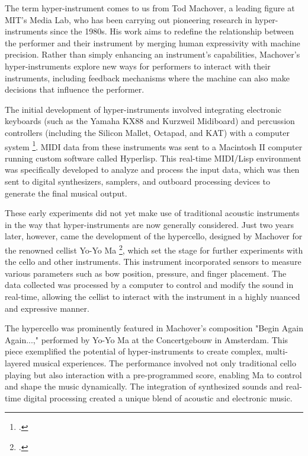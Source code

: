 \documentclass[12pt,twoside,maitrise]{dms_ks}
\theoremstyle{definition}
\begin{document}
{The term hyper-instrument comes to us from Tod Machover, a leading figure at MIT's Media Lab, who has been carrying out pioneering research in hyper-instruments since the 1980s. 
His work aims to redefine the relationship between the performer and their instrument by merging human expressivity with machine precision. 
Rather than simply enhancing an instrument's capabilities, Machover's hyper-instruments explore new ways for performers to interact with their instruments, including feedback mechanisms where the machine can also make decisions that influence the performer.

The initial development of hyper-instruments involved integrating electronic keyboards (such as the Yamaha KX88 and Kurzweil Midiboard) and percussion controllers (including the Silicon Mallet, Octapad, and KAT) with a computer system \footcite{machover_hyper-instruments_1989}. 
MIDI data from these instruments was sent to a Macintosh II computer running custom software called Hyperlisp. 
This real-time MIDI/Lisp environment was specifically developed to analyze and process the input data, which was then sent to digital synthesizers, samplers, and outboard processing devices to generate the final musical output.

These early experiments did not yet make use of traditional acoustic instruments in the way that hyper-instruments are now generally considered. Just two years later, however, came the development of the hypercello, designed by Machover for the renowned cellist Yo-Yo Ma \footcite{levenson_taming_1994}, which set the stage for further experiments with the cello and other instruments. 
This instrument incorporated sensors to measure various parameters such as bow position, pressure, and finger placement. 
The data collected was processed by a computer to control and modify the sound in real-time, allowing the cellist to interact with the instrument in a highly nuanced and expressive manner.

The hypercello was prominently featured in Machover's composition "Begin Again Again...," performed by Yo-Yo Ma at the Concertgebouw in Amsterdam. 
This piece exemplified the potential of hyper-instruments to create complex, multi-layered musical experiences. 
The performance involved not only traditional cello playing but also interaction with a pre-programmed score, enabling Ma to control and shape the music dynamically. 
The integration of synthesized sounds and real-time digital processing created a unique blend of acoustic and electronic music.

}
\end{document}
